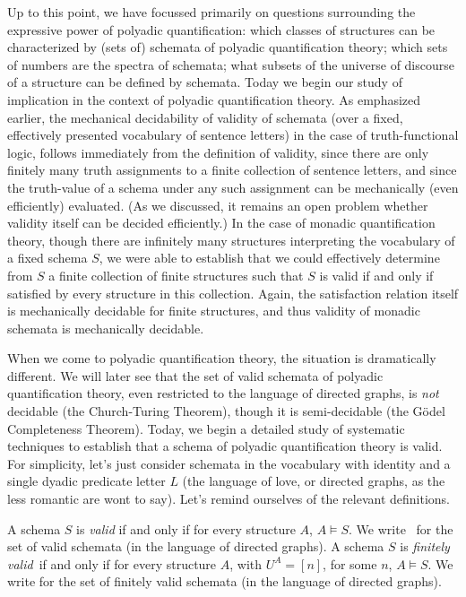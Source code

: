 

Up to this point, we have focussed primarily on questions surrounding the expressive power of polyadic quantification: which classes of structures can be characterized by (sets of) schemata of polyadic quantification theory; which sets of numbers are the spectra of schemata; what subsets of the universe of discourse of a structure can be defined by schemata. Today we begin our study of implication in the context of polyadic quantification theory. As emphasized earlier, the mechanical decidability of validity of schemata (over a fixed, effectively presented vocabulary of sentence letters)
in the case of truth-functional logic, follows immediately from 
the definition of validity, since there are only finitely many truth assignments to a finite collection of sentence letters, and since the truth-value of a schema under any such assignment can be mechanically (even efficiently) evaluated. (As we discussed, it remains an open problem whether validity itself can be decided efficiently.) In the case of monadic quantification theory, though there are infinitely many structures interpreting the vocabulary of a fixed schema $S$, we were able to establish that we could effectively determine from $S$ a finite collection of finite structures such that $S$ is valid if and only if satisfied by every structure in this collection. Again, the satisfaction relation itself is mechanically decidable for finite structures, and thus validity of monadic schemata is mechanically decidable.

When we come to polyadic quantification theory, the situation is dramatically different. We will later see that the set of valid schemata of polyadic quantification theory, even restricted to the language of directed graphs, is \emph{not} decidable (the Church-Turing Theorem), though it is semi-decidable (the G\"{o}del Completeness Theorem). Today, we begin a detailed study of systematic techniques to establish that a schema of polyadic quantification theory is valid.
\iffalse
For simplicity, let's just consider schemata in the vocabulary with identity and a single dyadic predicate letter $L$ (the language of love, or directed graphs, as the less romantic are wont to say). Let's remind ourselves of the relevant definitions.
\begin{definition}
A schema $S$ is \emph{valid} if and only if for every structure $A$, $A\models S$. We write \val\ for the set of valid schemata (in the language of directed graphs). A schema $S$ is \emph{finitely valid}\ if and only if for every structure $A$, with $U^A=[n]$, for some $n$, $A\models S$. We write \fval for the set of finitely valid schemata (in the language of directed graphs).
\end{definition}

